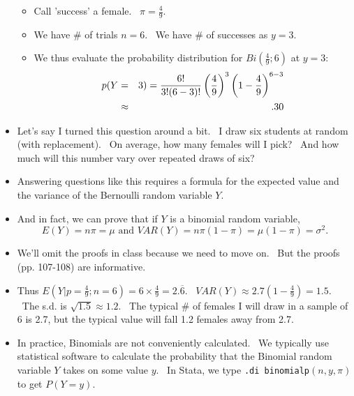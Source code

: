\documentclass[11pt]{article}
\begin{document}
\begin{itemize}
\begin{itemize}
\item Call 'success' a female. \ $\pi =\frac{4}{9}.$

\item We have \# of trials $n=6$. \ We have \# of successes as $y=3.$

\item We thus evaluate the probability distribution for $Bi(\frac{4}{9};6)$
at $y=3:$%
\begin{eqnarray*}
p(Y &=&3)=\frac{6!}{3!(6-3)!}\left( \frac{4}{9}\right) ^{3}\left( 1-\frac{4}{%
9}\right) ^{6-3} \\
&\approx &.30
\end{eqnarray*}
\end{itemize}

\item Let's say I turned this question around a bit. \ I draw six students
at random (with replacement). \ On average, how many females will I pick? \
And how much will this number vary over repeated draws of six?

\item Answering questions like this requires a formula for the expected
value and the variance of the Bernoulli random variable $Y$.

\item And in fact, we can prove that if $Y$ is a binomial random variable, 
\begin{equation*}
E(Y)=n\pi =\mu \text{ \ and \ \ }VAR(Y)=n\pi (1-\pi )=\mu (1-\pi )=\sigma
^{2}.
\end{equation*}

\item We'll omit the proofs in class because we need to move on. \ But the
proofs (pp. 107-108) are informative.

\item Thus $E(Y|p=\frac{4}{9};n=6)=6\times \frac{4}{9}=2.\overline{6}.$ \ $%
VAR(Y)\approx 2.7\left( 1-\frac{4}{9}\right) =1.5.$ \ The s.d. is $\sqrt{1.5}%
\approx 1.2$. \ The typical \# of females I will draw in a sample of 6 is
2.7, but the typical value will fall 1.2 females away from 2.7. \ 

\item In practice, Binomials are not conveniently calculated. \ We typically
use statistical software to calculate the probability that the Binomial
random variable $Y$ takes on some value $y.$ \ In Stata, we type \texttt{.di
binomialp}$(n,y,\pi )$ to get $P\left( Y=y\right) .$\newpage 
\end{itemize}
\end{document}
